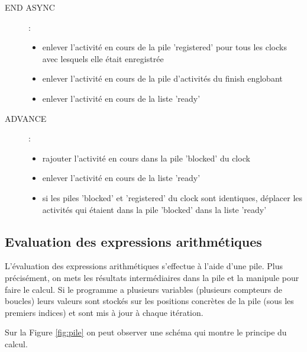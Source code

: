 \documentclass[12pt]{scrartcl}
\begin{document}
\begin{description}
   \item [END ASYNC] :
    \begin{itemize} 
      \item enlever l'activité en cours de la pile 'registered' pour tous les clocks avec lesquels elle était enregistrée
      \item enlever l'activité en cours de la pile d'activités du finish englobant
      \item enlever l'activité en cours de la liste 'ready'
    \end{itemize} 

   \item [ADVANCE] :
    \begin{itemize} 
      \item rajouter l'activité en cours dans la pile 'blocked' du clock
      \item enlever l'activité en cours de la liste 'ready'
      \item si les piles 'blocked' et 'registered' du clock sont identiques, 
      déplacer les activités qui étaient dans la pile 'blocked' dans la liste 'ready'
    \end{itemize} 

\end{description}



\subsection{Evaluation des expressions arithmétiques}
L'évaluation des expressions arithmétiques s'effectue à l'aide d'une pile. Plus précisément, on mets les résultats intermédiaires
dans la pile et la manipule pour faire le calcul. 
Si le programme a plusieurs variables (plusieurs compteurs de boucles) leurs valeurs sont stockés sur les positions concrètes 
de la pile (sous les premiers indices) et sont mis à jour à chaque itération. 

Sur la Figure \ref{fig:pile} on peut observer une schéma qui montre le principe du calcul. 
\end{document}
